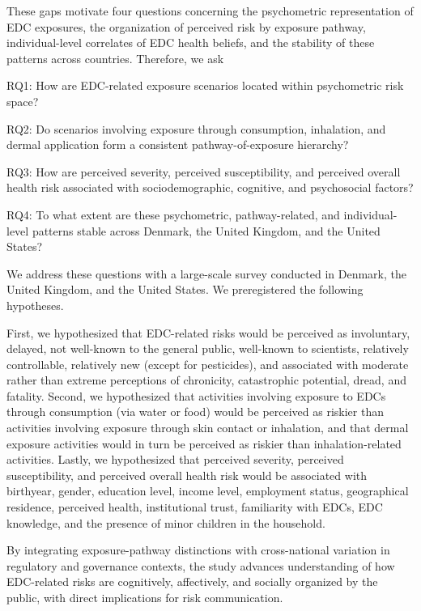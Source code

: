 These gaps motivate four questions concerning the psychometric representation of EDC exposures, the organization of perceived risk by exposure pathway, individual-level correlates of EDC health beliefs, and the stability of these patterns across countries. Therefore, we ask

RQ1: How are EDC-related exposure scenarios located within psychometric risk space?

RQ2: Do scenarios involving exposure through consumption, inhalation, and dermal application form a consistent pathway-of-exposure hierarchy?

RQ3: How are perceived severity, perceived susceptibility, and perceived overall health risk associated with sociodemographic, cognitive, and psychosocial factors?

RQ4: To what extent are these psychometric, pathway-related, and individual-level patterns stable across Denmark, the United Kingdom, and the United States?

We address these questions with a large-scale survey conducted in Denmark, the United Kingdom, and the United States. We preregistered the following hypotheses.

First, we hypothesized that EDC-related risks would be perceived as involuntary, delayed, not well-known to the general public, well-known to scientists, relatively controllable, relatively new (except for pesticides), and associated with moderate rather than extreme perceptions of chronicity, catastrophic potential, dread, and fatality. Second, we hypothesized that activities involving exposure to EDCs through consumption (via water or food) would be perceived as riskier than activities involving exposure through skin contact or inhalation, and that dermal exposure activities would in turn be perceived as riskier than inhalation-related activities. Lastly, we hypothesized that perceived severity, perceived susceptibility, and perceived overall health risk would be associated with birthyear, gender, education level, income level, employment status, geographical residence, perceived health, institutional trust, familiarity with EDCs, EDC knowledge, and the presence of minor children in the household.

By integrating exposure-pathway distinctions with cross-national variation in regulatory and governance contexts, the study advances understanding of how EDC-related risks are cognitively, affectively, and socially organized by the public, with direct implications for risk communication.